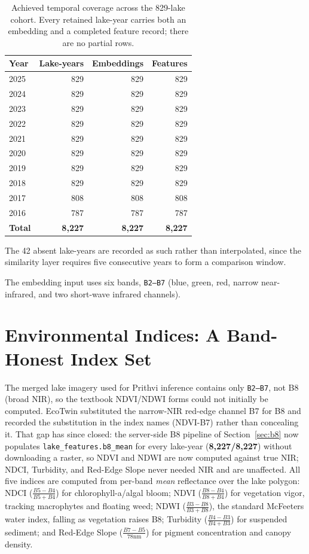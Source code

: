 \documentclass[12pt,a4paper,oneside]{report}
\newcommand{\code}[1]{\texttt{#1}}
\begin{document}
\begin{table}[H]
\centering
\caption{Achieved temporal coverage across the 829-lake cohort.
Every retained lake-year carries both an embedding and a completed
feature record; there are no partial rows.}
\label{tab:year_coverage}
\begin{tabular}{lrrr}
\toprule
Year & Lake-years & Embeddings & Features \\
\midrule
2025 & 829 & 829 & 829 \\
2024 & 829 & 829 & 829 \\
2023 & 829 & 829 & 829 \\
2022 & 829 & 829 & 829 \\
2021 & 829 & 829 & 829 \\
2020 & 829 & 829 & 829 \\
2019 & 829 & 829 & 829 \\
2018 & 829 & 829 & 829 \\
2017 & 808 & 808 & 808 \\
2016 & 787 & 787 & 787 \\
\midrule
\textbf{Total} & \textbf{8{,}227} & \textbf{8{,}227} &
\textbf{8{,}227} \\
\bottomrule
\end{tabular}
\end{table}

The 42 absent lake-years are recorded as such rather than
interpolated, since the similarity layer requires five consecutive
years to form a comparison window.

The embedding input uses six bands, \code{B2--B7} (blue, green, red,
narrow near-infrared, and two short-wave infrared channels).

\section{Environmental Indices: A Band-Honest Index Set}

The merged lake imagery used for Prithvi inference contains only
\code{B2--B7}, not B8 (broad NIR), so the textbook NDVI/NDWI forms
could not initially be computed. EcoTwin substituted the narrow-NIR
red-edge channel B7 for B8 and recorded the substitution in the
index names (NDVI-B7) rather than concealing it. That gap has since
closed: the server-side B8 pipeline of Section~\ref{sec:b8} now
populates \code{lake\_features.b8\_mean} for every lake-year
(\textbf{8{,}227/8{,}227}) without downloading a raster, so NDVI and
NDWI are now computed against true NIR; NDCI, Turbidity, and
Red-Edge Slope never needed NIR and are unaffected. All five indices
are computed from per-band \emph{mean} reflectance over the lake
polygon: NDCI ($\frac{B5-B4}{B5+B4}$) for chlorophyll-a/algal bloom;
NDVI ($\frac{B8-B4}{B8+B4}$) for vegetation vigor, tracking
macrophytes and floating weed; NDWI ($\frac{B3-B8}{B3+B8}$), the
standard McFeeters water index, falling as vegetation raises B8;
Turbidity ($\frac{B4-B3}{B4+B3}$) for suspended sediment; and
Red-Edge Slope ($\frac{B7-B5}{78\text{nm}}$) for pigment
concentration and canopy density.
\end{document}
